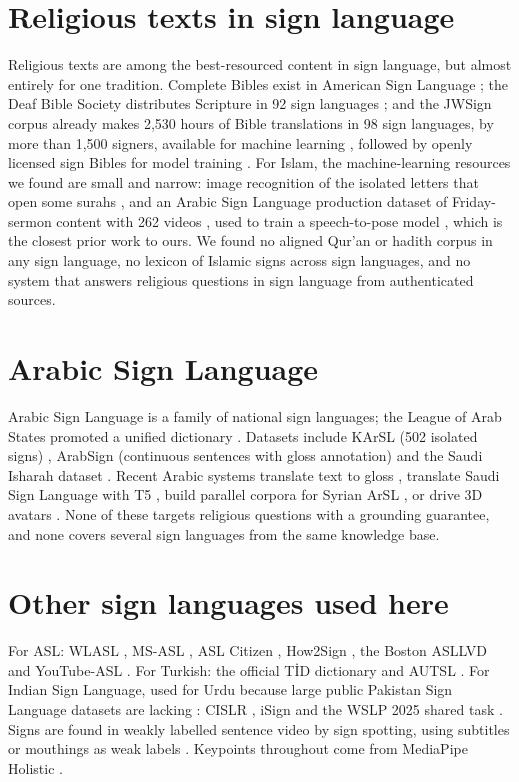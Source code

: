 \section{Religious texts in sign language}
Religious texts are among the best-resourced content in sign language, but almost entirely for one tradition. Complete
Bibles exist in American Sign Language \cite{aslv,jwaslbible}; the Deaf Bible Society distributes Scripture in 92 sign
languages \cite{deafbible}; and the JWSign corpus already makes 2,530 hours of Bible translations in 98 sign languages,
by more than 1,500 signers, available for machine learning \cite{jwsign}, followed by openly licensed sign Bibles for
model training \cite{osb}. For Islam, the machine-learning resources we found are small and narrow: image recognition of
the isolated letters that open some surahs \cite{quransign1,quransign2}, and an Arabic Sign Language production dataset
of Friday-sermon content with 262 videos \cite{quransign3}, used to train a speech-to-pose model \cite{quransign4},
which is the closest prior work to ours. We found no aligned Qur'an or hadith corpus in any sign language, no lexicon of
Islamic signs across sign languages, and no system that answers religious questions in sign language from authenticated
sources.

\section{Arabic Sign Language}
Arabic Sign Language is a family of national sign languages; the League of Arab States promoted a unified dictionary
\cite{arslunified}. Datasets include KArSL (502 isolated signs) \cite{karsl}, ArabSign (continuous sentences with gloss
annotation) \cite{arabsign} and the Saudi Isharah dataset \cite{isharah}. Recent Arabic systems translate text to gloss
\cite{arglosstrans}, translate Saudi Sign Language with T5 \cite{saudit5}, build parallel corpora for Syrian ArSL
\cite{syrisign}, or drive 3D avatars \cite{algerianavatar,arabicavatar2024,arabic3davatar2022}. None of these targets
religious questions with a grounding guarantee, and none covers several sign languages from the same knowledge base.

\section{Other sign languages used here}
For ASL: WLASL \cite{wlasl}, MS-ASL \cite{msasl}, ASL Citizen \cite{aslcitizen}, How2Sign \cite{how2sign}, the Boston
ASLLVD \cite{boston} and YouTube-ASL \cite{youtubeasl,youtubeaslkp}. For Turkish: the official T\.{I}D dictionary
\cite{tidsozluk} and AUTSL \cite{autsl}. For Indian Sign Language, used for Urdu because large public Pakistan Sign
Language datasets are lacking \cite{psl}: CISLR \cite{cislr}, iSign \cite{isign} and the WSLP 2025 shared task
\cite{wslp,wslpislword}. Signs are found in weakly labelled sentence video by sign spotting, using subtitles or mouthings
as weak labels \cite{bsl1k,momeni2022}. Keypoints throughout come from MediaPipe \cite{mediapipe} Holistic
\cite{mediapipeholistic,blazepose}.

